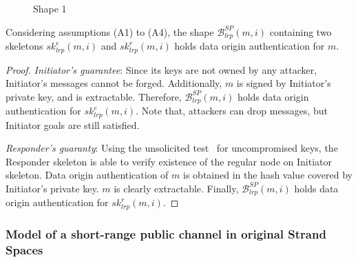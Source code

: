 \begin{figure}
\begin{center}
\end{center}
\caption{Shape 1} 
\label{protocol1}
\end{figure}

\begin{Proposition}
Considering assumptions (A1) to (A4), the shape $\mathcal{B}^{SP}_{lrp}(m,i)$ containing two skeletons $sk^e_{lrp}(m,i)$ and $sk^r_{lrp}(m,i)$ holds data origin authentication for $m$. 
\end{Proposition}

\begin{proof}

\emph{Initiator's guarantee}: Since its keys are not owned by any attacker, Initiator's messages cannot be forged. Additionally, $m$ is signed by Initiator's private key, and is extractable. Therefore, $\mathcal{B}^{SP}_{lrp}(m,i)$ holds data origin authentication for $sk^e_{lrp}(m,i)$. Note that, attackers can drop messages, but Initiator goals are still satisfied. 

\emph{Responder's guaranty}: Using the unsolicited test~\cite{Guttman:2002:ATS:568264.568267} for uncompromised keys, the Responder skeleton is able to verify existence of the regular node on Initiator skeleton. Data origin authentication of $m$ is obtained in the hash value covered by Initiator's private key. $m$ is clearly extractable. Finally, $\mathcal{B}^{SP}_{lrp}(m,i)$ holds data origin authentication for $sk^r_{lrp}(m,i)$.
 \end{proof}

\subsubsection*{Model of a short-range public channel in original Strand Spaces}\label{shortrange}

